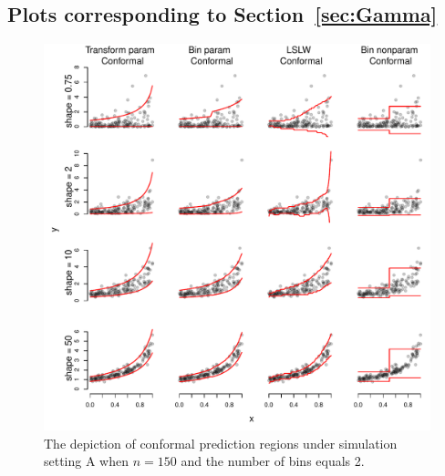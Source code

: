 \documentclass[11pt]{article}\usepackage[]{graphicx}\usepackage[]{color}
\makeatletter
\def\maxwidth{ %
  \ifdim\Gin@nat@width>\linewidth
    \linewidth
  \else
    \Gin@nat@width
  \fi
}
\newenvironment{knitrout}{}{} %
\makeatother
\begin{document}
\newpage
\subsection{Plots corresponding to Section~\ref{sec:Gamma}}
\label{sec:gammaplots}

\begin{figure}[h!]
\begin{center}
\begin{knitrout}
\color{fgcolor}
\includegraphics[width=\maxwidth]{figure/conformal-plots-A-150-1} 

\end{knitrout}
\end{center}
\caption{The depiction of conformal prediction regions under simulation 
  setting A when $n = 150$ and the number of bins equals 2.
}
\label{conformal-plots-A-150}
\end{figure}
\end{document}
